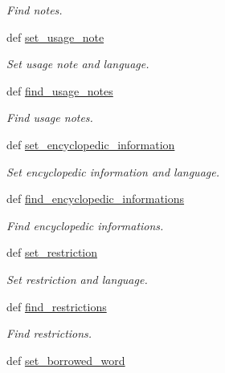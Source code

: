 \begin{DoxyCompactItemize}
\begin{DoxyCompactList}\small\item\em Find notes. \end{DoxyCompactList}\item 
def \hyperlink{classlmf_1_1src_1_1core_1_1sense_1_1_sense_a9062f1b17bbc52c353edaf26330dcbeb}{set\+\_\+usage\+\_\+note}
\begin{DoxyCompactList}\small\item\em Set usage note and language. \end{DoxyCompactList}\item 
def \hyperlink{classlmf_1_1src_1_1core_1_1sense_1_1_sense_af4a689fe644baaf594abb4d9a1b0ca55}{find\+\_\+usage\+\_\+notes}
\begin{DoxyCompactList}\small\item\em Find usage notes. \end{DoxyCompactList}\item 
def \hyperlink{classlmf_1_1src_1_1core_1_1sense_1_1_sense_a99c9a5071df517bc60f33121d46c0db1}{set\+\_\+encyclopedic\+\_\+information}
\begin{DoxyCompactList}\small\item\em Set encyclopedic information and language. \end{DoxyCompactList}\item 
def \hyperlink{classlmf_1_1src_1_1core_1_1sense_1_1_sense_a7f3f74ce33b047118343b29c4a5196ce}{find\+\_\+encyclopedic\+\_\+informations}
\begin{DoxyCompactList}\small\item\em Find encyclopedic informations. \end{DoxyCompactList}\item 
def \hyperlink{classlmf_1_1src_1_1core_1_1sense_1_1_sense_a0ed9917e40d5be2e90d628b55f962ee8}{set\+\_\+restriction}
\begin{DoxyCompactList}\small\item\em Set restriction and language. \end{DoxyCompactList}\item 
def \hyperlink{classlmf_1_1src_1_1core_1_1sense_1_1_sense_ad2997077bd0e68f4af1542ade3e64417}{find\+\_\+restrictions}
\begin{DoxyCompactList}\small\item\em Find restrictions. \end{DoxyCompactList}\item 
def \hyperlink{classlmf_1_1src_1_1core_1_1sense_1_1_sense_a1174533bdabb24b077835ad384fb564c}{set\+\_\+borrowed\+\_\+word}

\end{DoxyCompactItemize}
